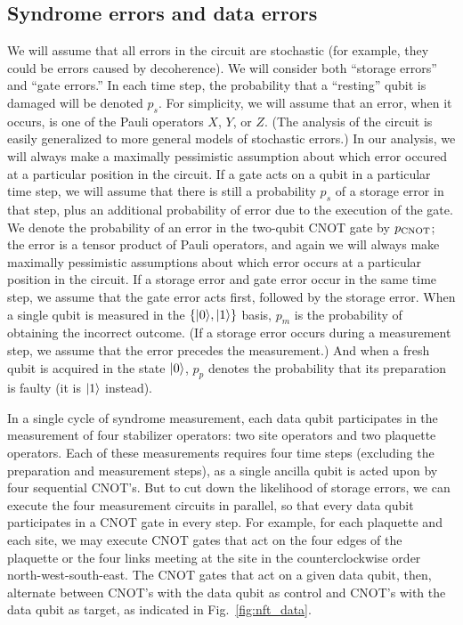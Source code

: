 \subsection{Syndrome errors and data errors}
We will assume that all errors in the circuit are stochastic (for example, they could be errors caused by decoherence). We will consider both ``storage errors'' and ``gate errors.'' In each time step, the probability that a ``resting'' qubit is damaged will be denoted $p_s$. For simplicity, we will assume that an error, when it occurs, is one of the Pauli operators $X$, $Y$, or $Z$. (The analysis of the circuit is easily generalized to more general models of stochastic errors.) In our analysis, we will always make a maximally pessimistic assumption about which error occured at a particular position in the circuit. If a gate acts on a qubit in a particular time step, we will assume that there is still a probability $p_s$ of a storage error in that step, plus an additional probability of error due to the execution of the gate. We denote the probability of an error in the two-qubit CNOT
gate by $p_{\rm CNOT}$; the error is a tensor product of Pauli operators, and again we will always make maximally pessimistic assumptions about which error occurs at a particular position in the circuit.  If a storage error and gate error occur in the same time step, we assume that the gate error acts first, followed by the storage error. When a single qubit is
measured in the $\{|{0}\rangle,|{1}\rangle\}$ basis, $p_m$ is the probability of
obtaining the incorrect outcome.  (If a storage error occurs during a measurement step, we assume that the error precedes the measurement.) And when a fresh qubit is acquired in the
state $|{0}\rangle$, $p_p$ denotes the probability that its preparation is faulty
(it is $|{1}\rangle$ instead). 

In a single cycle of syndrome measurement, each data qubit participates in the
measurement of four stabilizer operators: two site operators and two plaquette
operators.  Each of these measurements requires four time steps (excluding the preparation and measurement steps), as a single
ancilla qubit is acted upon by four sequential CNOT's.  But to cut down the
likelihood of storage errors, we can execute the four measurement circuits
in parallel, so that every data qubit participates in a CNOT gate in every
step. For example, for each plaquette and each site, we may execute CNOT gates that act on the four edges of the plaquette or the four links meeting at the site in the counterclockwise order north-west-south-east. The CNOT gates that act on a given data qubit, then, alternate between CNOT's with the data qubit as control and CNOT's with the data qubit as target, as indicated in Fig.~\ref{fig:nft_data}.

